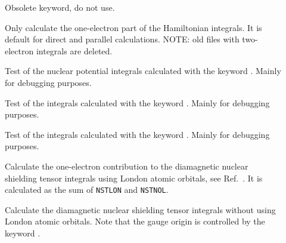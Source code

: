 \begin{description}
\item[] Obsolete keyword, do not use.

\item[] Only calculate the one-electron part of the
Hamiltonian integrals. It is default for direct and parallel calculations.
NOTE: old files with two-electron integrals are deleted.

\item[] Test of the nuclear potential integrals
calculated with the keyword . Mainly for debugging
purposes.

\item[] Test of the integrals calculated with the
keyword . Mainly for debugging purposes.

\item[] Test of the integrals calculated with the
keyword . Mainly for debugging purposes.

\item[] Calculate the one-electron contribution to the
diamagnetic nuclear shielding
tensor integrals using London atomic
orbitals, see Ref.~\cite{thpjjcp95}. It is
calculated as the sum of \verb|NSTLON| and \verb|NSTNOL|.


\item[] Calculate the diamagnetic nuclear shielding
tensor integrals without using London atomic orbitals. Note that the gauge origin is controlled by the keyword .



\end{description}

